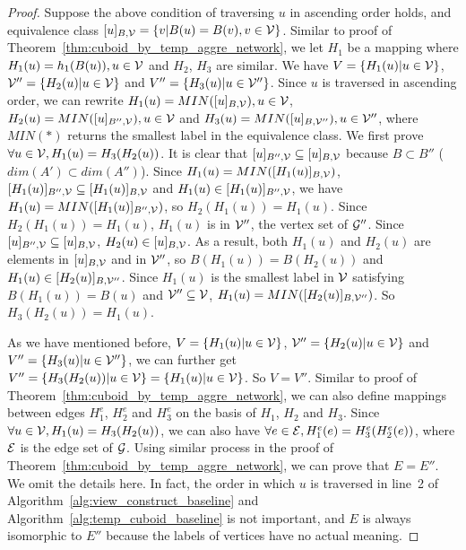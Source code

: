 \documentclass[10pt,journal,compsoc]{IEEEtran}
\begin{document}
{\begin{proof}
	Suppose the above condition of traversing $ u $ in ascending order holds, and equivalence class $ [u]_{B,\mathcal{V}}=\{v|B(u)=B(v),v\in \mathcal{V}\} $. Similar to proof of Theorem~\ref{thm:cuboid_by_temp_aggre_network}, we let $ H_1 $ be a mapping where $ H_1(u)=h_1(B(u)),u\in \mathcal{V} $ and $ H_2 $, $ H_3 $ are similar. We have $ V=\{H_1(u)|u\in \mathcal{V}\} $, $ \mathcal{V}''=\{H_2(u)|u\in \mathcal{V}\} $ and $ V''=\{H_3(u)|u\in \mathcal{V}''\} $. Since $ u $ is traversed in ascending order, we can rewrite $ H_1(u)=MIN([u]_{B,\mathcal{V}}),u\in \mathcal{V} $, $ H_2(u)=MIN([u]_{B'',\mathcal{V}}),u\in \mathcal{V} $ and $ H_3(u)=MIN([u]_{B,\mathcal{V}''}),u\in \mathcal{V}'' $, where $ MIN(\ast) $ returns the smallest label in the equivalence class. We first prove $ \forall u\in \mathcal{V}, H_1(u)=H_3(H_2(u)) $. It is clear that $ [u]_{B'',\mathcal{V}}\subseteq [u]_{B,\mathcal{V}} $ because $ B\subset B'' $ ($ dim(A')\subset dim(A'') $). Since $ H_1(u)=MIN([H_1(u)]_{B,\mathcal{V}}) $, $ [H_1(u)]_{B'',\mathcal{V}}\subseteq [H_1(u)]_{B,\mathcal{V}} $ and $ H_1(u)\in [H_1(u)]_{B'',\mathcal{V}}$, we have $ H_1(u)=MIN([H_1(u)]_{B'',\mathcal{V}}) $, so $ H_2(H_1(u))=H_1(u) $. Since $ H_2(H_1(u))=H_1(u) $, $ H_1(u) $ is in $ \mathcal{V}'' $, the vertex set of $ \mathcal{G}'' $. Since $ [u]_{B'',\mathcal{V}}\subseteq [u]_{B,\mathcal{V}} $, $ H_2(u)\in [u]_{B,\mathcal{V}} $. As a result, both $ H_1(u) $ and $ H_2(u) $ are elements in $ [u]_{B,\mathcal{V}} $ and in $ \mathcal{V}'' $, so $ B(H_1(u))=B(H_2(u)) $ and $ H_1(u)\in [H_2(u)]_{B,\mathcal{V}''} $. Since $ H_1(u) $ is the smallest label in $ \mathcal{V} $ satisfying $ B(H_1(u))=B(u) $ and $ \mathcal{V}''\subseteq \mathcal{V} $, $ H_1(u)=MIN([H_2(u)]_{B,\mathcal{V}''}) $. So $ H_3(H_2(u))=H_1(u) $.
	
	As we have mentioned before, $ V=\{H_1(u)|u\in \mathcal{V}\} $, $ \mathcal{V}''=\{H_2(u)|u\in \mathcal{V}\} $ and $ V''=\{H_3(u)|u\in \mathcal{V}''\} $, we can further get $ V''=\{H_3(H_2(u))|u\in \mathcal{V}\}=\{H_1(u)|u\in \mathcal{V}\} $. So $ V=V'' $. Similar to proof of Theorem~\ref{thm:cuboid_by_temp_aggre_network}, we can also define mappings between edges $ H_1^e $, $ H_2^e $ and $ H_3^e $ on the basis of $ H_1 $, $ H_2 $ and $ H_3 $. Since $ \forall u\in \mathcal{V}, H_1(u)=H_3(H_2(u)) $, we can also have $ \forall e \in \mathcal{E}, H_1^e(e)=H_3^e(H_2^e(e)) $, where $ \mathcal{E} $ is the edge set of $ \mathcal{G} $. Using similar process in the proof of Theorem~\ref{thm:cuboid_by_temp_aggre_network}, we can prove that $ E=E'' $. We omit the details here. In fact, the order in which $ u $ is traversed in line~2 of Algorithm~\ref{alg:view_construct_baseline} and Algorithm~\ref{alg:temp_cuboid_baseline} is not important, and $ E $ is always isomorphic to $ E'' $ because the labels of vertices have no actual meaning.
\end{proof}
}
\end{document}
